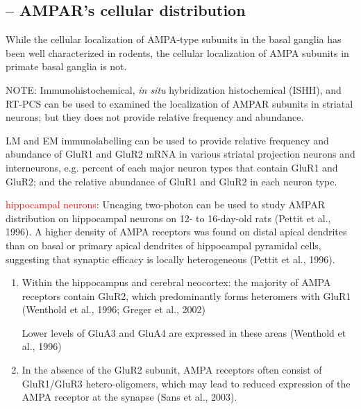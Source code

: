 \subsection{-- AMPAR's cellular distribution}
\label{sec:AMPAR-distribution}

While the cellular localization of AMPA-type subunits in the basal ganglia has
been well characterized in rodents, the cellular localization of AMPA subunits
in primate basal ganglia is not. 

\begin{mdframed}

NOTE: Immunohistochemical, {\it in situ} hybridization histochemical (ISHH), and
RT-PCS can be used to examined the localization of AMPAR subunits in striatal
neurons; but they does not provide relative frequency and abundance.

LM and EM immunolabelling can be used to provide relative frequency and
abundance of GluR1 and GluR2 mRNA in various striatal projection neurons and
interneurons, e.g. percent of each major neuron types that contain GluR1 and
GluR2; and the relative abundance of GluR1 and GluR2 in each neuron type.
\end{mdframed}

\textcolor{red}{hippocampal neurons}:
Uncaging two-photon can be used to study AMPAR distribution on hippocampal
neurons on 12- to 16-day-old rats (Pettit et al., 1996). A higher density of
AMPA receptors was found on distal apical dendrites than on basal or primary
apical dendrites of hippocampal pyramidal cells, suggesting that synaptic
efficacy is locally heterogeneous (Pettit et al., 1996).
\begin{enumerate}
  \item Within the hippocampus and cerebral neocortex:
  the majority of AMPA receptors contain GluR2, which predominantly forms
  heteromers with GluR1 (Wenthold et al., 1996; Greger et al., 2002)
  
  Lower levels of GluA3 and GluA4 are expressed in these areas (Wenthold et al.,
  1996)
  
  \item  In the absence of the GluR2 subunit, AMPA receptors often consist of
  GluR1/GluR3 hetero-oligomers, which may lead to reduced expression of the AMPA
  receptor at the synapse (Sans et al., 2003). 
\end{enumerate}

